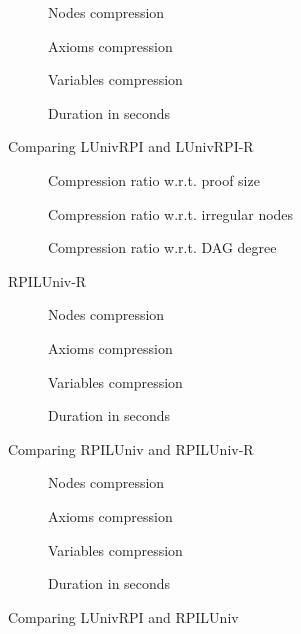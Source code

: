 \begin{figure}[hbt]
  \begin{subfigure}{0.5\textwidth}
    \centering
    \caption{Nodes compression}
  \end{subfigure}
  \begin{subfigure}{0.5\textwidth}
    \centering
    \caption{Axioms compression}
  \end{subfigure}
  \begin{subfigure}{0.5\textwidth}
    \centering
    \caption{Variables compression}
  \end{subfigure}
  \begin{subfigure}{0.5\textwidth}
    \centering
    \caption{Duration in seconds}
  \end{subfigure}
  \caption{Comparing LUnivRPI and LUnivRPI-R}
\end{figure}
\begin{figure}[hbt]
  \begin{subfigure}{\textwidth}
    \centering
    \caption{Compression ratio w.r.t. proof size}
  \end{subfigure}
  \begin{subfigure}{\textwidth}
    \centering
    \caption{Compression ratio w.r.t. irregular nodes}
  \end{subfigure}
  \begin{subfigure}{\textwidth}
    \centering
    \caption{Compression ratio w.r.t. DAG degree}
  \end{subfigure}
  \caption{RPILUniv-R}
\end{figure}
\begin{figure}[hbt]
  \begin{subfigure}{0.5\textwidth}
    \centering
    \caption{Nodes compression}
  \end{subfigure}
  \begin{subfigure}{0.5\textwidth}
    \centering
    \caption{Axioms compression}
  \end{subfigure}
  \begin{subfigure}{0.5\textwidth}
    \centering
    \caption{Variables compression}
  \end{subfigure}
  \begin{subfigure}{0.5\textwidth}
    \centering
    \caption{Duration in seconds}
  \end{subfigure}
  \caption{Comparing RPILUniv and RPILUniv-R}
\end{figure}
\begin{figure}[hbt]
  \begin{subfigure}{0.5\textwidth}
    \centering
    \caption{Nodes compression}
  \end{subfigure}
  \begin{subfigure}{0.5\textwidth}
    \centering
    \caption{Axioms compression}
  \end{subfigure}
  \begin{subfigure}{0.5\textwidth}
    \centering
    \caption{Variables compression}
  \end{subfigure}
  \begin{subfigure}{0.5\textwidth}
    \centering
    \caption{Duration in seconds}
  \end{subfigure}
  \caption{Comparing LUnivRPI and RPILUniv}
\end{figure}
